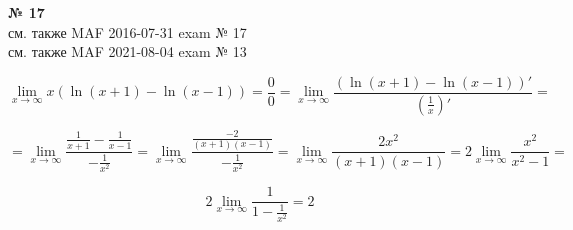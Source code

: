 \documentclass{article}
\begin{document}
\textbf{№ 17} 
\\
см. также MAF 2016-07-31 exam № 17 \\
см. также MAF 2021-08-04 exam № 13

$$ \lim\limits_{x \to \infty} x \left( \ln{(x+1)} - \ln{(x-1)} \right)
= \frac{0}{0}
= \lim\limits_{x \to \infty} \frac{\left( \ln{(x+1)} - \ln{(x-1)} \right)'}{\left( \frac{1}{x} \right)'}
= $$

$$ = \lim\limits_{x \to \infty} \frac{\frac{1}{x+1} - \frac{1}{x-1}}{-\frac{1}{x^2}}
= \lim\limits_{x \to \infty} \frac{\frac{-2}{(x+1)(x-1)}}{-\frac{1}{x^2}} 
= \lim\limits_{x \to \infty} \frac{2x^2}{(x+1)(x-1)}
= 2 \lim\limits_{x \to \infty} \frac{x^2}{x^2-1}
= $$

$$ 2 \lim\limits_{x \to \infty} \frac{1}{1- \frac{1}{x^2}}
= 2 $$
\end{document}
